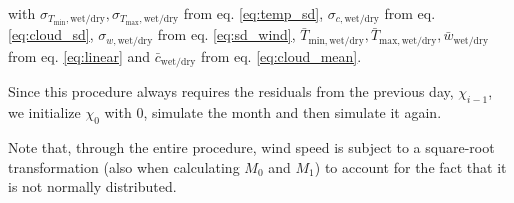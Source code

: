\begin{refsection}
with $\sigma_{T_\mathrm{min},\mathrm{wet/dry}}, \sigma_{T_\mathrm{max},\mathrm{wet/dry}}$ from eq. \eqref{eq:temp_sd}, $\sigma_{c,\mathrm{wet/dry}}$ from eq. \eqref{eq:cloud_sd}, $\sigma_{w,\mathrm{wet/dry}}$ from eq. \eqref{eq:sd_wind}, $\bar{T}_{\mathrm{min}, \mathrm{wet/dry}}, \bar{T}_{\mathrm{max}, \mathrm{wet/dry}}, \bar{w}_\mathrm{wet/dry}$ from eq. \eqref{eq:linear} and $\bar{c}_{\mathrm{wet/dry}}$ from eq. \eqref{eq:cloud_mean}.

Since this procedure always requires the residuals from the previous day, $\chi_{i-1}$, we initialize $\chi_0$ with 0, simulate the month and then simulate it again.

Note that, through the entire procedure, wind speed is subject to a square-root transformation (also when calculating $M_0$ and $M_1$) to account for the fact that it is not normally distributed.


\end{refsection}
